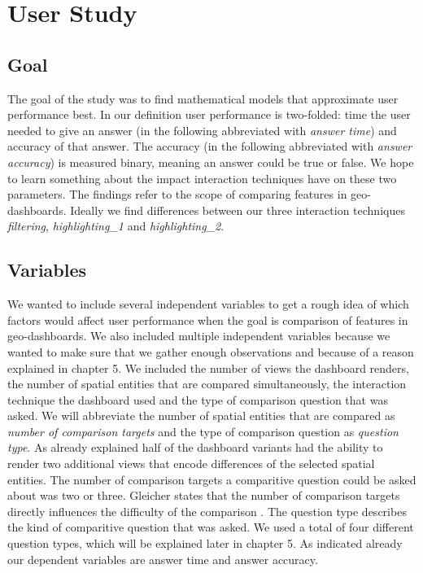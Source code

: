 \chapter{User Study}

\section{Goal}
The goal of the study was to find mathematical models that approximate user performance best. In our definition user
performance is two-folded: time the user needed to give an answer (in the following abbreviated with \textit{answer time}) and accuracy of
that answer. The accuracy (in the following abbreviated with \textit{answer accuracy}) is measured binary, meaning an answer could be true or false. We hope to learn something about the impact interaction techniques have on these two parameters. The findings refer to the scope of comparing features in geo-dashboards. Ideally we find differences
between our three interaction techniques \textit{filtering}, \textit{highlighting\_1} and \textit{highlighting\_2}.

\section{Variables}
We wanted to include several independent variables to get a rough idea of which factors would affect user performance when the goal
is comparison of features in geo-dashboards. We also included multiple independent variables because we wanted to make sure that we gather
enough observations and because of a reason explained in chapter 5.
We included the number of views the dashboard renders, the number of spatial entities that are compared simultaneously,
the interaction technique the dashboard used and the type of comparison question that was asked. We will abbreviate the number of spatial
entities that are compared as \textit{number of comparison targets} and the type of comparison question as \textit{question type}. As already
explained half of the dashboard variants had the ability to render two additional views that encode differences of the selected spatial entities.
The number of comparison targets a comparitive question could be asked about was two or three. Gleicher states that the number of comparison targets
directly influences the difficulty of the comparison \citep*{Gleicher.2018}. The question type describes the kind of comparitive question
that was asked. We used a total of four different question types, which will be explained later in chapter 5.
As indicated already our dependent variables are answer time and answer accuracy.

